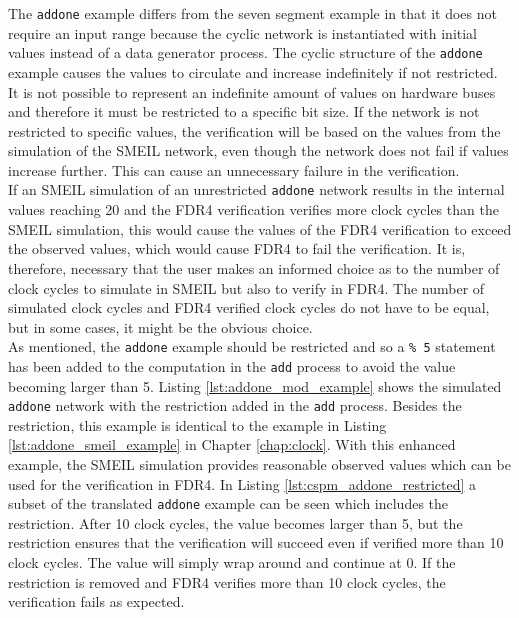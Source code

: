 The \texttt{addone} example differs from the seven segment example in that it does not require an input range because the cyclic network is instantiated with initial values instead of a data generator process. The cyclic structure of the \texttt{addone} example causes the values to circulate and increase indefinitely if not restricted. It is not possible to represent an indefinite amount of values on hardware buses and therefore it must be restricted to a specific bit size. If the network is not restricted to specific values, the verification will be based on the values from the simulation of the SMEIL network, even though the network does not fail if values increase further.  This can cause an unnecessary failure in the verification. \\

If an SMEIL simulation of an unrestricted \texttt{addone} network results in the internal values reaching 20 and the FDR4 verification verifies more clock cycles than the SMEIL simulation, this would cause the values of the FDR4 verification to exceed the observed values, which would cause FDR4 to fail the verification. It is, therefore, necessary that the user makes an informed choice as to the number of clock cycles to simulate in SMEIL but also to verify in FDR4. The number of simulated clock cycles and FDR4 verified clock cycles do not have to be equal, but in some cases, it might be the obvious choice. \\

As mentioned, the \texttt{addone} example should be restricted and so a \texttt{\% 5} statement has been added to the computation in the \texttt{add} process to avoid the value becoming larger than 5. Listing \ref{lst:addone_mod_example} shows the simulated \texttt{addone} network with the restriction added in the \texttt{add} process. Besides the restriction, this example is identical to the example in Listing \ref{lst:addone_smeil_example} in Chapter \ref{chap:clock}.
With this enhanced example, the SMEIL simulation provides reasonable observed values which can be used for the verification in FDR4. In Listing \ref{lst:cspm_addone_restricted} a subset of the translated \texttt{addone} example can be seen which includes the restriction.
After 10 clock cycles, the value becomes larger than 5, but the restriction ensures that the verification will succeed even if verified more than 10 clock cycles. The value will simply wrap around and continue at 0. If the restriction is removed and FDR4 verifies more than 10 clock cycles, the verification fails as expected. \\


